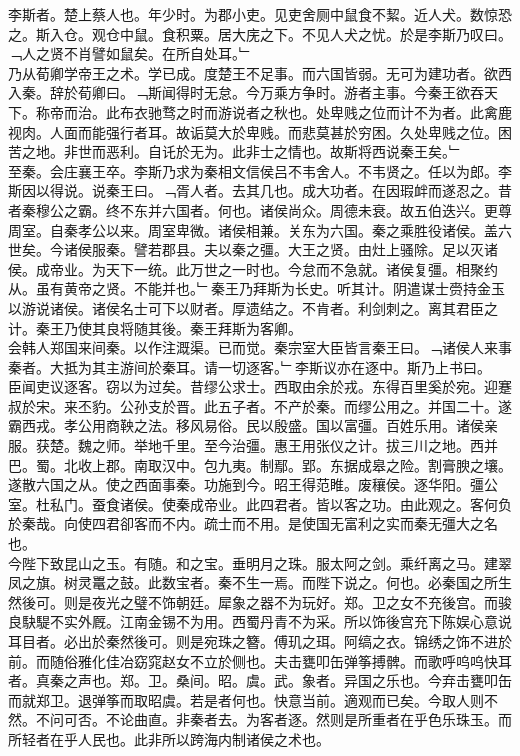 \documentclass{zhvt-classic}
\begin{document}

\hspace*{2em}李斯者。楚上蔡人也。年少时。为郡小吏。见吏舍厕中鼠食不絜。近人犬。数惊恐之。斯入仓。观仓中鼠。食积粟。居大庑之下。不见人犬之忧。於是李斯乃叹曰。﹁人之贤不肖譬如鼠矣。在所自处耳。﹂\\
\hspace*{2em}乃从荀卿学帝王之术。学已成。度楚王不足事。而六国皆弱。无可为建功者。欲西入秦。辞於荀卿曰。﹁斯闻得时无怠。今万乘方争时。游者主事。今秦王欲吞天下。称帝而治。此布衣驰骛之时而游说者之秋也。处卑贱之位而计不为者。此禽鹿视肉。人面而能强行者耳。故诟莫大於卑贱。而悲莫甚於穷困。久处卑贱之位。困苦之地。非世而恶利。自讬於无为。此非士之情也。故斯将西说秦王矣。﹂\\
\hspace*{2em}至秦。会庄襄王卒。李斯乃求为秦相文信侯吕不韦舍人。不韦贤之。任以为郎。李斯因以得说。说秦王曰。﹁胥人者。去其几也。成大功者。在因瑕衅而遂忍之。昔者秦穆公之霸。终不东并六国者。何也。诸侯尚众。周德未衰。故五伯迭兴。更尊周室。自秦孝公以来。周室卑微。诸侯相兼。关东为六国。秦之乘胜役诸侯。盖六世矣。今诸侯服秦。譬若郡县。夫以秦之彊。大王之贤。由灶上骚除。足以灭诸侯。成帝业。为天下一统。此万世之一时也。今怠而不急就。诸侯复彊。相聚约从。虽有黄帝之贤。不能并也。﹂秦王乃拜斯为长史。听其计。阴遣谋士赍持金玉以游说诸侯。诸侯名士可下以财者。厚遗结之。不肯者。利剑刺之。离其君臣之计。秦王乃使其良将随其後。秦王拜斯为客卿。\\
\hspace*{2em}会韩人郑国来间秦。以作注溉渠。已而觉。秦宗室大臣皆言秦王曰。﹁诸侯人来事秦者。大抵为其主游间於秦耳。请一切逐客。﹂李斯议亦在逐中。斯乃上书曰。\\
\hspace*{2em}臣闻吏议逐客。窃以为过矣。昔缪公求士。西取由余於戎。东得百里奚於宛。迎蹇叔於宋。来丕豹。公孙支於晋。此五子者。不产於秦。而缪公用之。并国二十。遂霸西戎。孝公用商鞅之法。移风易俗。民以殷盛。国以富彊。百姓乐用。诸侯亲服。获楚。魏之师。举地千里。至今治彊。惠王用张仪之计。拔三川之地。西并巴。蜀。北收上郡。南取汉中。包九夷。制鄢。郢。东据成皋之险。割膏腴之壤。遂散六国之从。使之西面事秦。功施到今。昭王得范睢。废穰侯。逐华阳。彊公室。杜私门。蚕食诸侯。使秦成帝业。此四君者。皆以客之功。由此观之。客何负於秦哉。向使四君卻客而不内。疏士而不用。是使国无富利之实而秦无彊大之名也。\\
\hspace*{2em}今陛下致昆山之玉。有随。和之宝。垂明月之珠。服太阿之剑。乘纤离之马。建翠凤之旗。树灵鼍之鼓。此数宝者。秦不生一焉。而陛下说之。何也。必秦国之所生然後可。则是夜光之璧不饰朝廷。犀象之器不为玩好。郑。卫之女不充後宫。而骏良駃騠不实外厩。江南金锡不为用。西蜀丹青不为采。所以饰後宫充下陈娱心意说耳目者。必出於秦然後可。则是宛珠之簪。傅玑之珥。阿缟之衣。锦绣之饰不进於前。而随俗雅化佳冶窈窕赵女不立於侧也。夫击甕叩缶弹筝搏髀。而歌呼呜呜快耳者。真秦之声也。郑。卫。桑间。昭。虞。武。象者。异国之乐也。今弃击甕叩缶而就郑卫。退弹筝而取昭虞。若是者何也。快意当前。適观而已矣。今取人则不然。不问可否。不论曲直。非秦者去。为客者逐。然则是所重者在乎色乐珠玉。而所轻者在乎人民也。此非所以跨海内制诸侯之术也。\\
\end{document}
